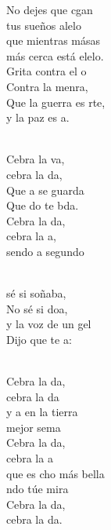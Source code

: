 \documentclass[12pt]{article}
\begin{document}
\begin{multicols*}{2}
\begin{cancion}
	No dejes que cgan\\
	tus sueños alelo\\
	que mientras másas\\
	más cerca está elelo.\\
	Grita contra el o\\
	Contra la menra,\\
	Que la guerra es rte,\\
	y la paz es a.\\\jump\\
	\begin{chorus}%
	Cebra la va, \\
	cebra la da,\\
	Que a se guarda\\
	Que do te bda.\\
	Cebra la da, \\
	cebra la a,\\
	sendo a segundo  \\
	\end{chorus}%
	\jump\\
	 sé si soñaba,\\
	No sé si doa, \\
	y la voz de un gel\\
	Dijo que te a:\\\jump\\
	\begin{chorus}%
	Cebra la da, \\
	cebra la da\\
	y a en la tierra\\
	 mejor sema\\
	Cebra la da, \\
	cebra la a\\
	que es cho más bella \\
	ndo túe mira\\
	Cebra la da,\\
	cebra la da.\\
	\end{chorus}%
	\jump\\
\end{cancion}%


\end{multicols*}
\end{document}
